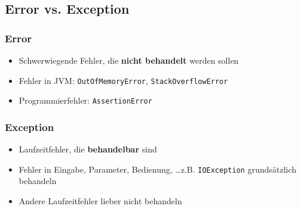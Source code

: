 \subsection{Error vs. Exception}
\vspace{-.9\abovedisplayskip}
\begin{minipage}[t]{0.5\columnwidth}
    \subsubsection{Error}
    \raggedright%
    \begin{itemize}
        \item Schwerwiegende Fehler, die \textbf{nicht behandelt} werden sollen
        \item Fehler in JVM: \lstinline{OutOfMemoryError}, \lstinline{StackOverflowError} %
        \item Programmierfehler: \lstinline{AssertionError}
    \end{itemize}
\end{minipage}\hfill%
\begin{minipage}[t]{0.49\columnwidth}
    \subsubsection{Exception}
    \raggedright%
    \begin{itemize}
        \item Laufzeitfehler, die \textbf{behandelbar} sind
        \item Fehler in Eingabe, Parameter, Bedienung, \ldots z.B. \lstinline{IOException} \textrightarrow{} grundsätzlich behandeln
        \item Andere Laufzeitfehler \textrightarrow{} lieber nicht behandeln
    \end{itemize}
\end{minipage}
    

